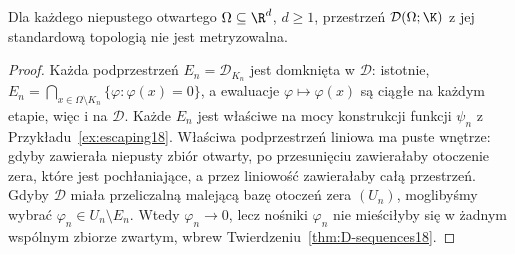 \begin{twierdzenie}[Niemetryzowalność]
\label{thm:D-nonmetric18}
Dla każdego niepustego otwartego $\Omega\subseteq\R^d$,
$d\ge1$, przestrzeń $\mathcal D(\Omega;\K)$ z jej
standardową topologią nie jest metryzowalna.
\end{twierdzenie}
\begin{proof}
Każda podprzestrzeń $E_n=\mathcal D_{K_n}$ jest domknięta
w $\mathcal D$: istotnie,
$E_n=\bigcap_{x\in\Omega\setminus K_n}\{\varphi:\varphi(x)=0\}$,
a ewaluacje $\varphi\mapsto\varphi(x)$ są ciągłe
na każdym etapie, więc i na $\mathcal D$.
Każde $E_n$ jest właściwe na mocy konstrukcji funkcji
$\psi_n$ z Przykładu~\ref{ex:escaping18}.
Właściwa podprzestrzeń liniowa ma puste wnętrze:
gdyby zawierała niepusty zbiór otwarty, po przesunięciu
zawierałaby otoczenie zera, które jest pochłaniające,
a przez liniowość zawierałaby całą przestrzeń.
Gdyby $\mathcal D$ miała przeliczalną malejącą bazę
otoczeń zera $(U_n)$, moglibyśmy wybrać
$\varphi_n\in U_n\setminus E_n$. Wtedy
$\varphi_n\to0$, lecz nośniki $\varphi_n$ nie mieściłyby
się w żadnym wspólnym zbiorze zwartym, wbrew
Twierdzeniu~\ref{thm:D-sequences18}.
\end{proof}

